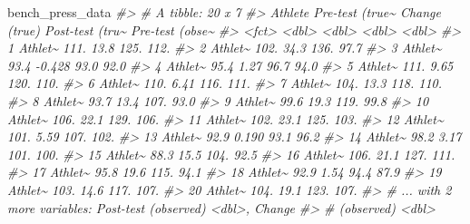 \documentclass[
]{book}
\newenvironment{Shaded}{\begin{snugshade}}{\end{snugshade}}
\newcommand{\CommentTok}[1]{\textcolor[rgb]{0.56,0.35,0.01}{\textit{#1}}}
\newcommand{\NormalTok}[1]{#1}
\begin{document}
\begin{Shaded}
\begin{Highlighting}[]
\NormalTok{bench\_press\_data}
\CommentTok{\#> \# A tibble: 20 x 7}
\CommentTok{\#>    Athlete \textasciigrave{}Pre{-}test (true\textasciitilde{} \textasciigrave{}Change (true)\textasciigrave{} \textasciigrave{}Post{-}test (tru\textasciitilde{} \textasciigrave{}Pre{-}test (obse\textasciitilde{}}
\CommentTok{\#>    <fct>              <dbl>           <dbl>            <dbl>            <dbl>}
\CommentTok{\#>  1 Athlet\textasciitilde{}            111.           13.8              125.             112. }
\CommentTok{\#>  2 Athlet\textasciitilde{}            102.           34.3              136.              97.7}
\CommentTok{\#>  3 Athlet\textasciitilde{}             93.4          {-}0.428             93.0             92.0}
\CommentTok{\#>  4 Athlet\textasciitilde{}             95.4           1.27              96.7             94.0}
\CommentTok{\#>  5 Athlet\textasciitilde{}            111.            9.65             120.             110. }
\CommentTok{\#>  6 Athlet\textasciitilde{}            110.            6.41             116.             111. }
\CommentTok{\#>  7 Athlet\textasciitilde{}            104.           13.3              118.             110. }
\CommentTok{\#>  8 Athlet\textasciitilde{}             93.7          13.4              107.              93.0}
\CommentTok{\#>  9 Athlet\textasciitilde{}             99.6          19.3              119.              99.8}
\CommentTok{\#> 10 Athlet\textasciitilde{}            106.           22.1              129.             106. }
\CommentTok{\#> 11 Athlet\textasciitilde{}            102.           23.1              125.             103. }
\CommentTok{\#> 12 Athlet\textasciitilde{}            101.            5.59             107.             102. }
\CommentTok{\#> 13 Athlet\textasciitilde{}             92.9           0.190             93.1             96.2}
\CommentTok{\#> 14 Athlet\textasciitilde{}             98.2           3.17             101.             100. }
\CommentTok{\#> 15 Athlet\textasciitilde{}             88.3          15.5              104.              92.5}
\CommentTok{\#> 16 Athlet\textasciitilde{}            106.           21.1              127.             111. }
\CommentTok{\#> 17 Athlet\textasciitilde{}             95.8          19.6              115.              94.1}
\CommentTok{\#> 18 Athlet\textasciitilde{}             92.9           1.54              94.4             87.9}
\CommentTok{\#> 19 Athlet\textasciitilde{}            103.           14.6              117.             107. }
\CommentTok{\#> 20 Athlet\textasciitilde{}            104.           19.1              123.             107. }
\CommentTok{\#> \# ... with 2 more variables: \textasciigrave{}Post{-}test (observed)\textasciigrave{} <dbl>, \textasciigrave{}Change}
\CommentTok{\#> \#   (observed)\textasciigrave{} <dbl>}
\end{Highlighting}
\end{Shaded}
\end{document}
